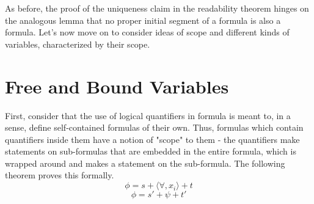 \documentclass{article}
\begin{document}
As before, the proof of the uniqueness claim in the readability theorem hinges on the analogous lemma that no proper initial segment of a formula is also a formula. Let's now move on to consider ideas of scope and different kinds of variables, characterized by their scope.

\section{Free and Bound Variables}
First, consider that the use of logical quantifiers in formula is meant to, in a sense, define self-contained formulas of their own. Thus, formulas which contain quantifiers inside them have a notion of "scope" to them - the quantifiers make statements on sub-formulas that are embedded in the entire formula, which is wrapped around and makes a statement on the sub-formula. The following theorem proves this formally.
    $$ \phi = s + \langle \forall, x_i \rangle + t $$
    $$ \phi = s' + \psi + t' $$
\end{document}
